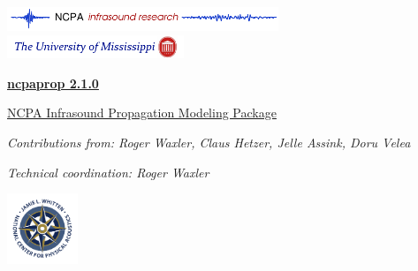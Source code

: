 \documentclass[10pt]{article}
\newcommand{\version}{2.1.0}
\begin{document}

\vspace*{-50pt}
\includegraphics[width=230pt]{figs/logos/color_logo_UTTR.pdf}
\hspace*{65pt}
\includegraphics[width=150pt]{figs/logos/UM_logo.png}
\vspace*{50pt}


\vspace*{0.05\textheight}

\begin{center}

\begin{Huge} \underline{\textbf{ncpaprop \version}} \end{Huge} 

\vspace*{0.025\textheight} 

\begin{Large}
\underline{NCPA Infrasound Propagation Modeling Package}
\end{Large} 

\vspace*{0.06\textheight}

\textsl{Contributions from: Roger Waxler, Claus Hetzer, Jelle Assink, Doru Velea}

\vspace*{0.02\textheight}

\textsl{Technical coordination: Roger Waxler}

\end{center}

\vspace*{0.06\textheight}

\begin{center}
\includegraphics[height=60pt]{figs/logos/NCPA-Logo-Crest.pdf}
\quad
{}

\end{center}
\end{document}
